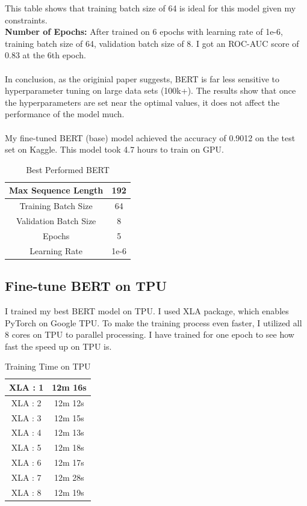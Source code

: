 \documentclass[11pt,a4paper]{article}
\begin{document}
\noindent This table shows that training batch size of 64 is ideal for this model given my constraints.\\

\noindent \textbf {Number of Epochs: }  After trained on 6 epochs with learning rate of 1e-6, training batch size of 64, validation batch size of 8. I got an ROC-AUC score of 0.83 at the 6th epoch.\\
\\
 In conclusion, as the originial paper suggests, BERT is far less sensitive to hyperparameter tuning on large data sets (100k+)\cite{BERT}. The results show that once the hyperparameters are set near the optimal values, it does not affect the performance of the model much.\\
\\
\noindent My fine-tuned BERT (base) model achieved the accuracy of 0.9012 on the test set on Kaggle. This model took 4.7 hours to train on GPU.\\

\begin{table}[!htbp]
	\centering
	\begin{tabular}{|c|c|}
		\hline
		{Max Sequence Length}   & 192  \\ \hline
		{Training Batch Size}   & 64   \\ \hline
		{Validation Batch Size} & 8    \\ \hline
		{Epochs}                & 5    \\ \hline
		{Learning Rate}         & 1e-6 \\ \hline
	\end{tabular}
	\caption{\label{table:my-label} Best Performed BERT}
\end{table}


\subsection{Fine-tune BERT on TPU}

I trained my best BERT model on TPU. I used XLA package, which enables PyTorch on Google TPU. To make the training process even faster, I utilized all 8 cores on TPU to parallel processing. I have trained for one epoch to see how fast the speed up on TPU is.\\

\begin{table}[!htbp]
	\centering
	\begin{tabular}{|c|c|}
		\hline
		{XLA : 1} & 12m 16s \\ \hline
		{XLA : 2} & 12m 12s \\ \hline
		{XLA : 3} & 12m 15s \\ \hline
		{XLA : 4} & 12m 13s \\ \hline
		{XLA : 5} & 12m 18s \\ \hline
		{XLA : 6} & 12m 17s \\ \hline
		{XLA : 7} & 12m 28s \\ \hline
		{XLA : 8} & 12m 19s \\ \hline
	\end{tabular}
	\caption{\label{table:my-label} Training Time on TPU}
\end{table}
\end{document}
